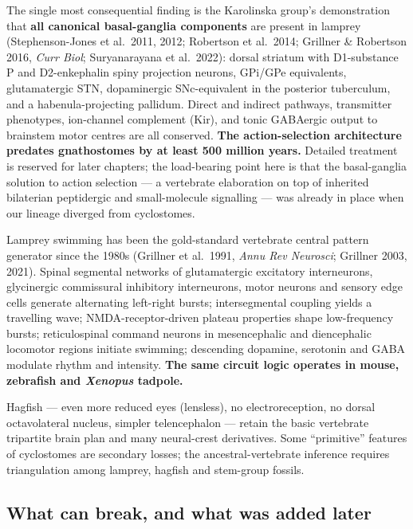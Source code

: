 The single most consequential finding is the Karolinska group's demonstration that \textbf{all canonical basal-ganglia components} are present in lamprey (Stephenson-Jones et al.~2011, 2012; Robertson et al.~2014; Grillner \& Robertson 2016, \emph{Curr Biol}; Suryanarayana et al.~2022): dorsal striatum with D1-substance P and D2-enkephalin spiny projection neurons, GPi/GPe equivalents, glutamatergic STN, dopaminergic SNc-equivalent in the posterior tuberculum, and a habenula-projecting pallidum. Direct and indirect pathways, transmitter phenotypes, ion-channel complement (Kir), and tonic GABAergic output to brainstem motor centres are all conserved. \textbf{The action-selection architecture predates gnathostomes by at least 500 million years.} Detailed treatment is reserved for later chapters; the load-bearing point here is that the basal-ganglia solution to action selection --- a vertebrate elaboration on top of inherited bilaterian peptidergic and small-molecule signalling --- was already in place when our lineage diverged from cyclostomes.

Lamprey swimming has been the gold-standard vertebrate central pattern generator since the 1980s (Grillner et al.~1991, \emph{Annu Rev Neurosci}; Grillner 2003, 2021). Spinal segmental networks of glutamatergic excitatory interneurons, glycinergic commissural inhibitory interneurons, motor neurons and sensory edge cells generate alternating left-right bursts; intersegmental coupling yields a travelling wave; NMDA-receptor-driven plateau properties shape low-frequency bursts; reticulospinal command neurons in mesencephalic and diencephalic locomotor regions initiate swimming; descending dopamine, serotonin and GABA modulate rhythm and intensity. \textbf{The same circuit logic operates in mouse, zebrafish and \emph{Xenopus} tadpole.}

Hagfish --- even more reduced eyes (lensless), no electroreception, no dorsal octavolateral nucleus, simpler telencephalon --- retain the basic vertebrate tripartite brain plan and many neural-crest derivatives. Some ``primitive'' features of cyclostomes are secondary losses; the ancestral-vertebrate inference requires triangulation among lamprey, hagfish and stem-group fossils.

\subsection{What can break, and what was added later}\label{04_urbilateria-what-can-break-and-what-was-added-later}

